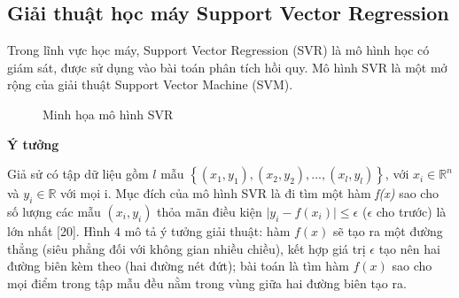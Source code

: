 \documentclass[12pt]{extarticle}
\begin{document}
		\subsection{Giải thuật học máy Support Vector Regression}
			\par Trong lĩnh vực học máy, Support Vector Regression (SVR) là mô hình học có giám sát, được sử dụng vào bài toán phân tích hồi quy. Mô hình SVR là một mở rộng của giải thuật Support Vector Machine (SVM).
\begin{figure}[h!]
				\begin{center}
				\end{center}
					\caption{Minh họa mô hình SVR}
				\label{fig:foody}
			\end{figure}
			\par \textbf{Ý tưởng}
				\par Giả sử có tập dữ liệu gồm $l$ mẫu $\left\{\left(x_{1},y_{1}\right),\left(x_{2},y_{2}\right),...,\left(x_{l},y_{l}\right)\right\}$, với $x_{i}\in  \mathbb{R}^{n}$ và $y_{i}\in  \mathbb{R}$ với mọi i. Mục đích của mô hình SVR là đi tìm một hàm \textit{f(x)} sao cho số lượng các mẫu $\left(x_{i},y_{i}\right)$ thỏa mãn điều kiện $\mid y_{i} - f(x_{i})\mid \leq \epsilon $ ($\epsilon$ cho trước) là lớn nhất [20]. Hình 4 mô tả ý tưởng giải thuật: hàm $f(x)$ sẽ tạo ra một đường thẳng (siêu phẳng đối với không gian nhiều chiều), kết hợp giá trị $\epsilon$ tạo nên hai đường biên kèm theo (hai đường nét đứt); bài toán là tìm hàm $f(x)$ sao cho mọi điểm trong tập mẫu đều nằm trong vùng giữa hai đường biên tạo ra.
				
\end{document}
